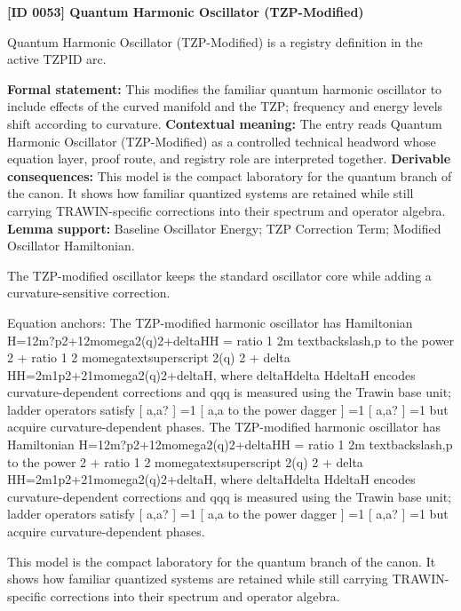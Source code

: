 \clearpage
\noindent\textbf{[ID 0053] Quantum Harmonic Oscillator (TZP-Modified)}\par
\vspace{0.35em}
\begingroup\small
{}
Quantum Harmonic Oscillator (TZP-Modified) is a registry definition in the active TZPID arc.

\begingroup\footnotesize\setlength{\emergencystretch}{3em}\sloppy
\textbf{Formal statement:} This modifies the familiar quantum harmonic oscillator to include effects of the curved manifold and the TZP; frequency and energy levels shift according to curvature. \textbf{Contextual meaning:} The entry reads Quantum Harmonic Oscillator (TZP-Modified) as a controlled technical headword whose equation layer, proof route, and registry role are interpreted together. \textbf{Derivable consequences:} This model is the compact laboratory for the quantum branch of the canon. It shows how familiar quantized systems are retained while still carrying TRAWIN-specific corrections into their spectrum and operator algebra. \textbf{Lemma support:} Baseline Oscillator Energy; TZP Correction Term; Modified Oscillator Hamiltonian.\par
\endgroup

The TZP-modified oscillator keeps the standard oscillator core while adding a curvature-sensitive correction.

Equation anchors: The TZP-modified harmonic oscillator has Hamiltonian H=12m?p2+12momega2(q)2+deltaHH = ratio 1 2m textbackslash,p to the power 2 + ratio 1 2 momegatextsuperscript 2(q) 2 + delta HH=2m1p2+21momega2(q)2+deltaH, where deltaHdelta HdeltaH encodes curvature-dependent corrections and qqq is measured using the Trawin base unit; ladder operators satisfy [ a,a? ] =1 [ a,a to the power dagger ] =1 [ a,a? ] =1 but acquire curvature-dependent phases. The TZP-modified harmonic oscillator has Hamiltonian H=12m?p2+12momega2(q)2+deltaHH = ratio 1 2m textbackslash,p to the power 2 + ratio 1 2 momegatextsuperscript 2(q) 2 + delta HH=2m1p2+21momega2(q)2+deltaH, where deltaHdelta HdeltaH encodes curvature-dependent corrections and qqq is measured using the Trawin base unit; ladder operators satisfy [ a,a? ] =1 [ a,a to the power dagger ] =1 [ a,a? ] =1 but acquire curvature-dependent phases.

This model is the compact laboratory for the quantum branch of the canon. It shows how familiar quantized systems are retained while still carrying TRAWIN-specific corrections into their spectrum and operator algebra.
\endgroup

